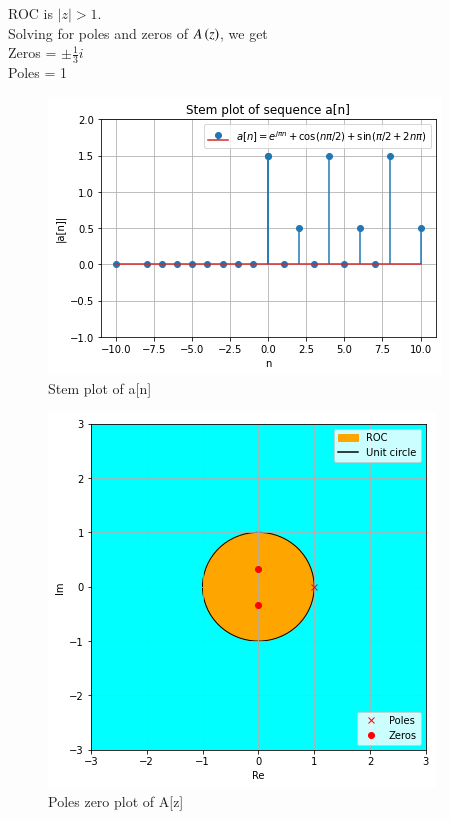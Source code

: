 \documentclass[journal,12pt,twocolumn]{IEEEtran}
\begin{document}
ROC is $|z|>1$.\\
Solving for poles and zeros of $A\left(z\right)$, we get\\
Zeros = $\pm \frac{1}{3}i$\\
Poles = 1
\begin{figure}[h]
\centering
\caption{Stem plot of a[n]}
\includegraphics[width = \columnwidth]{q2_quiz2}
\end{figure}
\begin{figure}[h]
\centering
\caption{Poles zero plot of A[z]}
\includegraphics[width = \columnwidth]{q2_quiz_2}
\end{figure}
\end{document}
